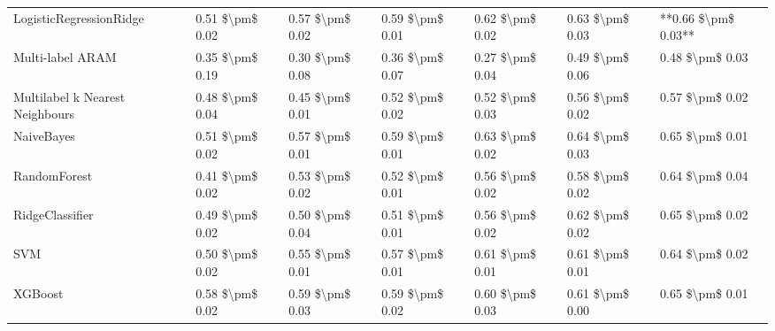 \begin{tabular}{lllllll}
        LogisticRegressionRidge & 0.51 \$\textbackslash pm\$ 0.02 &           0.57 \$\textbackslash pm\$ 0.02 &       0.59 \$\textbackslash pm\$ 0.01 &        0.62 \$\textbackslash pm\$ 0.02 &                         0.63 \$\textbackslash pm\$ 0.03 & **0.66 \$\textbackslash pm\$ 0.03** \\
               Multi-label ARAM & 0.35 \$\textbackslash pm\$ 0.19 &           0.30 \$\textbackslash pm\$ 0.08 &       0.36 \$\textbackslash pm\$ 0.07 &        0.27 \$\textbackslash pm\$ 0.04 &                         0.49 \$\textbackslash pm\$ 0.06 &     0.48 \$\textbackslash pm\$ 0.03 \\
Multilabel k Nearest Neighbours & 0.48 \$\textbackslash pm\$ 0.04 &           0.45 \$\textbackslash pm\$ 0.01 &       0.52 \$\textbackslash pm\$ 0.02 &        0.52 \$\textbackslash pm\$ 0.03 &                         0.56 \$\textbackslash pm\$ 0.02 &     0.57 \$\textbackslash pm\$ 0.02 \\
                     NaiveBayes & 0.51 \$\textbackslash pm\$ 0.02 &           0.57 \$\textbackslash pm\$ 0.01 &       0.59 \$\textbackslash pm\$ 0.01 &        0.63 \$\textbackslash pm\$ 0.02 &                         0.64 \$\textbackslash pm\$ 0.03 &     0.65 \$\textbackslash pm\$ 0.01 \\
                   RandomForest & 0.41 \$\textbackslash pm\$ 0.02 &           0.53 \$\textbackslash pm\$ 0.02 &       0.52 \$\textbackslash pm\$ 0.01 &        0.56 \$\textbackslash pm\$ 0.02 &                         0.58 \$\textbackslash pm\$ 0.02 &     0.64 \$\textbackslash pm\$ 0.04 \\
                RidgeClassifier & 0.49 \$\textbackslash pm\$ 0.02 &           0.50 \$\textbackslash pm\$ 0.04 &       0.51 \$\textbackslash pm\$ 0.01 &        0.56 \$\textbackslash pm\$ 0.02 &                         0.62 \$\textbackslash pm\$ 0.02 &     0.65 \$\textbackslash pm\$ 0.02 \\
                            SVM & 0.50 \$\textbackslash pm\$ 0.02 &           0.55 \$\textbackslash pm\$ 0.01 &       0.57 \$\textbackslash pm\$ 0.01 &        0.61 \$\textbackslash pm\$ 0.01 &                         0.61 \$\textbackslash pm\$ 0.01 &     0.64 \$\textbackslash pm\$ 0.02 \\
                        XGBoost & 0.58 \$\textbackslash pm\$ 0.02 &           0.59 \$\textbackslash pm\$ 0.03 &       0.59 \$\textbackslash pm\$ 0.02 &        0.60 \$\textbackslash pm\$ 0.03 &                         0.61 \$\textbackslash pm\$ 0.00 &     0.65 \$\textbackslash pm\$ 0.01 \\
\bottomrule
\end{tabular}
